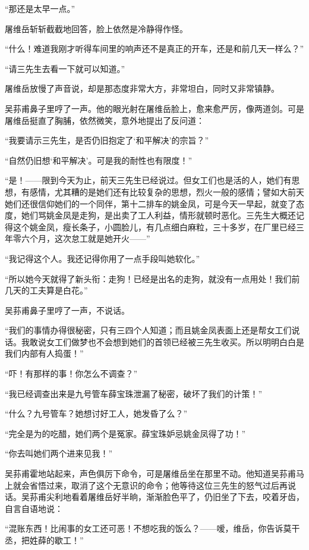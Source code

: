 \par “那还是太早一点。”
\par 屠维岳斩斩截截地回答，脸上依然是冷静得作怪。
\par “什么！难道我刚才听得车间里的响声还不是真正的开车，还是和前几天一样么？”
\par “请三先生去看一下就可以知道。”
\par 屠维岳放慢了声音说，却是那态度非常大方，非常坦白，同时又非常镇静。
\par 吴荪甫鼻子里哼了一声。他的眼光射在屠维岳脸上，愈来愈严厉，像两道剑。可是屠维岳挺直了胸脯，依然微笑，意外地提出了反问道：
\par “我要请示三先生，是否仍旧抱定了‘和平解决’的宗旨？”
\par “自然仍旧想‘和平解决’。可是我的耐性也有限度！”
\par “是！——限到今天为止，前天三先生已经说过。但女工们也是活的人，她们有思想，有感情，尤其糟的是她们还有比较复杂的思想，烈火一般的感情；譬如大前天她们还很信仰她们的一个同伴，第十二排车的姚金凤，可是今天一早起，就变了态度，她们骂姚金凤是走狗，是出卖了工人利益，情形就顿时恶化。三先生大概还记得这个姚金凤，瘦长条子，小圆脸儿，有几点细白麻粒，三十多岁，在厂里已经三年零六个月，这次怠工就是她开火——”
\par “我记得这个人。我还记得你用了一点手段叫她软化。”
\par “所以她今天就得了新头衔：走狗！已经是出名的走狗，就没有一点用处！我们前几天的工夫算是白花。”
\par 吴荪甫鼻子里哼了一声，不说话。
\par “我们的事情办得很秘密，只有三四个人知道；而且姚金凤表面上还是帮女工们说话。我敢说女工们做梦也不会想到她们的首领已经被三先生收买。所以明明白白是我们内部有人捣蛋！”
\par “吓！有那样的事！你怎么不调查？”
\par “我已经调查出来是九号管车薛宝珠泄漏了秘密，破坏了我们的计策！”
\par “什么？九号管车？她想讨好工人，她发昏了么？”
\par “完全是为的吃醋，她们两个是冤家。薛宝珠妒忌姚金凤得了功！”
\par “你去叫她们两个进来见我！”
\par 吴荪甫霍地站起来，声色俱厉下命令，可是屠维岳坐在那里不动。他知道吴荪甫马上就会省悟过来，取消了这个无意识的命令；他等待这位三先生的怒气过后再说话。吴荪甫尖利地看着屠维岳好半晌，渐渐脸色平了，仍旧坐了下去，咬着牙齿，自言自语地说：
\par “混账东西！比闹事的女工还可恶！不想吃我的饭么？——嗳，维岳，你告诉莫干丞，把姓薛的歇工！”
